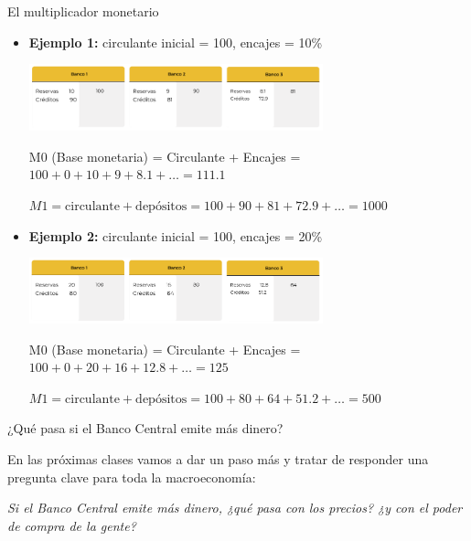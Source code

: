 \documentclass{beamer}
\begin{document}
\begin{frame}{El multiplicador monetario}
\begin{itemize}
    \item[\textbullet] \textbf{Ejemplo 1:} circulante inicial = 100, encajes = 10\%
    \begin{center}
        \scriptsize
        \includegraphics[width=8.5cm]{../Figures/C37.15.png}
        
        \vspace{0.3em}
        M0 (Base monetaria) = Circulante + Encajes = $100 + 0 + 10 + 9 + 8.1 + \dots =  111.1$
        
        \vspace{0.3em}
        $M1 = \text{circulante} + \text{depósitos} = 100 + 90 + 81 + 72.9 + \dots = 1000$
    \end{center}

    \item[\textbullet] \textbf{Ejemplo 2:} circulante inicial = 100, encajes = 20\%
    \begin{center}
        \scriptsize
        \includegraphics[width=8.5cm]{../Figures/C37.16.png}
        
        \vspace{0.3em}
        M0 (Base monetaria) = Circulante + Encajes = $100 + 0 + 20 + 16 + 12.8 + \dots = 125$
        
        \vspace{0.3em}
        $M1 = \text{circulante} + \text{depósitos} = 100 + 80 + 64 + 51.2 + \dots = 500$
    \end{center}
\end{itemize}
\end{frame}

\begin{frame}{¿Qué pasa si el Banco Central emite más dinero?}
    \begin{boxB}
        \centering
        En las próximas clases vamos a dar un paso más y tratar de responder una pregunta clave para toda la macroeconomía:

        \vspace{0.2em}
        \textit{Si el Banco Central emite más dinero, ¿qué pasa con los precios? ¿y con el poder de compra de la gente?}
    \end{boxB}
\end{frame}
\end{document}
